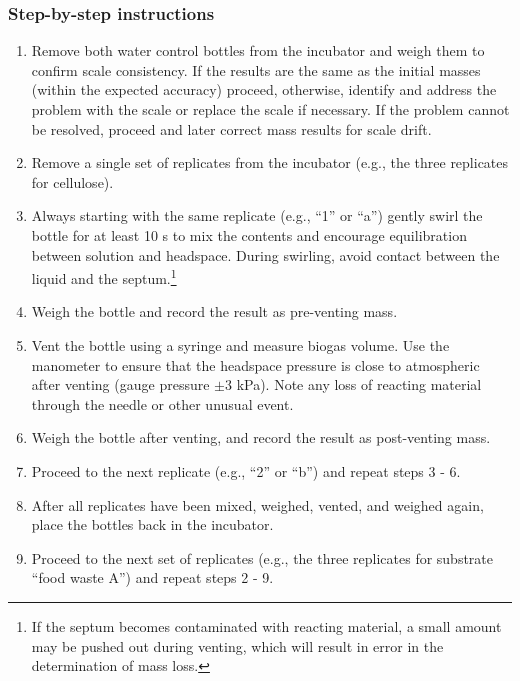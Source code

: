 \documentclass[]{article}
\begin{document}
\subsubsection{Step-by-step instructions}
\begin{enumerate}
    \item Remove both water control bottles from the incubator and weigh them to confirm scale consistency. 
      If the results are the same as the initial masses (within the expected accuracy) proceed, otherwise, identify and address the problem with the scale or replace the scale if necessary.
      If the problem cannot be resolved, proceed and later correct mass results for scale drift.
    \item Remove a single set of replicates from the incubator (e.g., the three replicates for cellulose).
    \item Always starting with the same replicate (e.g., ``1'' or ``a'') gently swirl the bottle for at least 10 s to mix the contents and encourage  equilibration between solution and headspace. 
      During swirling, avoid contact between the liquid and the septum.\footnote{
        If the septum becomes contaminated with reacting material, a small amount may be pushed out during venting, which will result in error in the determination of mass loss.}
    \item Weigh the bottle and record the result as pre-venting mass.
    \item Vent the bottle using a syringe and measure biogas volume.
      Use the manometer to ensure that the headspace pressure is close to atmospheric after venting (gauge pressure $\pm3$ kPa).
      Note any loss of reacting material through the needle or other unusual event.
    \item Weigh the bottle after venting, and record the result as post-venting mass. 
    \item Proceed to the next replicate (e.g., ``2'' or ``b'') and repeat steps 3 - 6.
    \item After all replicates have been mixed, weighed, vented, and weighed again, place the bottles back in the incubator.
    \item Proceed to the next set of replicates (e.g., the three replicates for substrate ``food waste A'') and repeat steps 2 - 9.
\end{enumerate}
\end{document}
